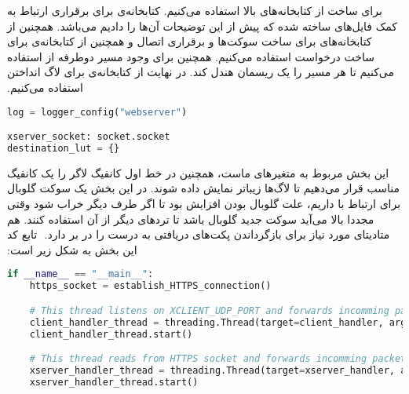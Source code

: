 ‫برای ساخت  از کتابخانه‌های بالا استفاده می‌کنیم. کتابخانه‌ی  برای برقراری ارتباط  به کمک فایل‌های ساخته شده که پیش از این توضیحات آن‌ها را دادیم می‌باشد. همچنین از کتابخانه‌های  برای ساخت سوکت‌ها و برقراری اتصال و همچنین از کتابخانه‌ی  برای ساخت درخواست  استفاده می‌کنیم. همچنین برای وجود مسیر دوطرفه از  استفاده می‌کنیم تا هر مسیر را یک ریسمان هندل کند. در نهایت از کتابخانه‌ی  برای لاگ انداختن استفاده می‌کنیم.
‫
\begin{latin}
\begin{lstlisting}[firstnumber=9, language=Python]
log = logger_config("webserver")

xserver_socket: socket.socket
destination_lut = {}	
\end{lstlisting}
\end{latin}

‫این بخش مربوط به متغیرهای  ماست، همچنین در خط اول کانفیگ لاگر را یک کانفیگ مناسب قرار می‌دهیم تا لاگ‌‌ها زیباتر نمایش داده شوند. در این بخش یک سوکت گلوبال برای ارتباط با  داریم، علت گلوبال بودن افزایش  بود تا اگر طرف دیگر خراب شود وقتی  مجددا بالا می‌آید سوکت جدید گلوبال باشد تا ترد‌های دیگر از آن استفاده کنند.  هم متادیتای مورد نیاز برای بازگرداندن پکت‌های دریافتی به  درست را در بر دارد.
‫
‫تابع  کد این بخش به شکل زیر است:
‫
\begin{latin}
\begin{lstlisting}[firstnumber=90, language=Python]
if __name__ == "__main__":
    https_socket = establish_HTTPS_connection()

    # This thread listens on XCLIENT_UDP_PORT and forwards incomming packets to XSERVER after adding header
    client_handler_thread = threading.Thread(target=client_handler, args=())
    client_handler_thread.start()

    # This thread reads from HTTPS socket and forwards incomming packets to CLIENT_PORT after removing custom header
    xserver_handler_thread = threading.Thread(target=xserver_handler, args=())
    xserver_handler_thread.start()
\end{lstlisting}
\end{latin}

